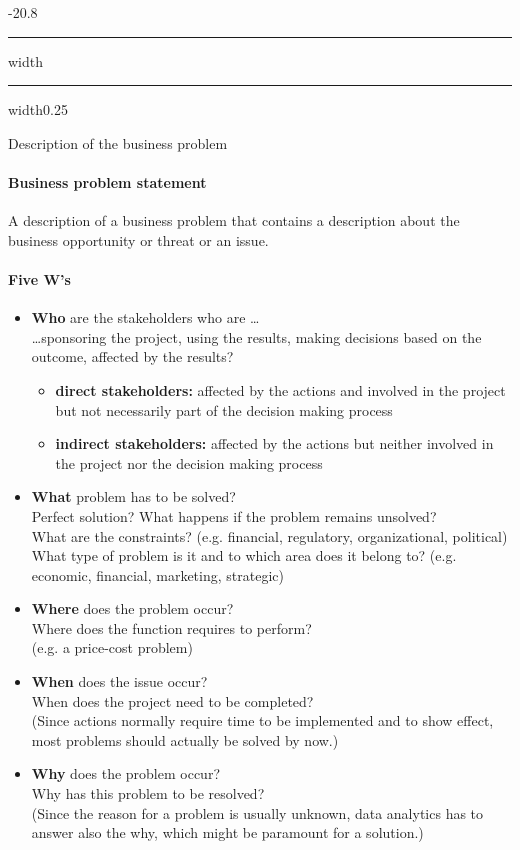 \documentclass[a4paper, landscape, 6pt, fleqn]{scrartcl}
\makeatletter
\renewcommand{\emph}[1]{\textbf{#1}}
\renewcommand{\subsection}{\@startsection{subsection}{1}{0mm}%
{-2\baselineskip}{0.8\baselineskip}%
{\hrule depth 0.2pt width\columnwidth\hrule depth0.75pt
width0.25\columnwidth\vspace*{1.2em}\large\bfseries}}
\makeatother
\begin{document}
\begin{multicols*}{4}
\subsection{Description of the business problem}

\paragraph{Business problem statement}

A description of a business problem that contains a description about the business opportunity or threat or an issue.

\paragraph{Five W's}

\begin{itemize}
\item \emph{Who} are the stakeholders who are \ldots \\
\ldots sponsoring the project, using the results, making decisions based on the outcome, affected by the results?
\begin{itemize}
\item \emph{direct stakeholders:} affected by the actions and involved in the project but not necessarily part of the decision making process
\item \emph{indirect stakeholders:} affected by the actions but neither involved in the project nor the decision making process
\end{itemize}
\item \emph{What} problem has to be solved? \\
Perfect solution? What happens if the problem remains unsolved? \\
What are the constraints? (e.g. financial, regulatory, organizational, political) \\
What type of problem is it and to which area does it belong to? (e.g. economic, financial, marketing, strategic)
\item \emph{Where} does the problem occur? \\
Where does the function requires to perform? \\
(e.g. a price-cost problem)
\item \emph{When} does the issue occur? \\
When does the project need to be completed? \\
(Since actions normally require time to be implemented and to show effect, most problems should actually be solved by now.)
\item \emph{Why} does the problem occur? \\
Why has this problem to be resolved? \\
(Since the reason for a problem is usually unknown, data analytics has to answer also the why, which might be paramount for a solution.)
\end{itemize}


\end{multicols*}
\end{document}
